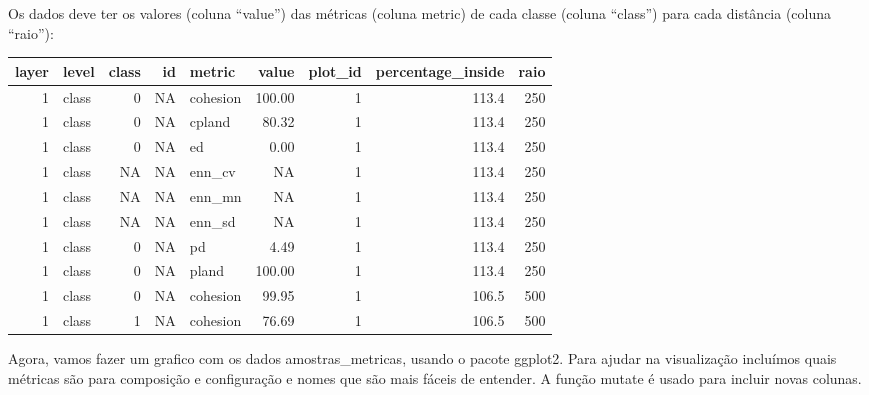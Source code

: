 \documentclass[
]{article}
\begin{document}
Os dados deve ter os valores (coluna ``value'') das métricas (coluna metric)
de cada classe (coluna ``class'') para cada distância (coluna ``raio''):

\begin{table}[!h]
\centering
\begin{tabular}[t]{r|l|r|r|l|r|r|r|r}
\hline
layer & level & class & id & metric & value & plot\_id & percentage\_inside & raio\\
\hline
1 & class & 0 & NA & cohesion & 100.00 & 1 & 113.4 & 250\\
\hline
1 & class & 0 & NA & cpland & 80.32 & 1 & 113.4 & 250\\
\hline
1 & class & 0 & NA & ed & 0.00 & 1 & 113.4 & 250\\
\hline
1 & class & NA & NA & enn\_cv & NA & 1 & 113.4 & 250\\
\hline
1 & class & NA & NA & enn\_mn & NA & 1 & 113.4 & 250\\
\hline
1 & class & NA & NA & enn\_sd & NA & 1 & 113.4 & 250\\
\hline
1 & class & 0 & NA & pd & 4.49 & 1 & 113.4 & 250\\
\hline
1 & class & 0 & NA & pland & 100.00 & 1 & 113.4 & 250\\
\hline
1 & class & 0 & NA & cohesion & 99.95 & 1 & 106.5 & 500\\
\hline
1 & class & 1 & NA & cohesion & 76.69 & 1 & 106.5 & 500\\
\hline
\end{tabular}
\end{table}

Agora, vamos fazer um grafico com os dados amostras\_metricas, usando o pacote ggplot2. Para ajudar na visualização incluímos quais métricas são para composição e configuração e nomes que são mais fáceis de entender. A função \colorbox[HTML]{d3d3d3}{mutate} é usado para incluir novas colunas.
\end{document}
